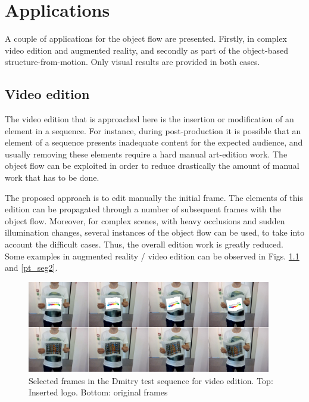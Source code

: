 \chapter{Applications} \label{chap:apps}

A couple of applications for the object flow are presented. Firstly, 
in complex video edition and augmented reality, and secondly as part 
of the object-based structure-from-motion. Only visual results are provided 
in both cases.

\section{Video edition}

The video edition that is approached here is the insertion or modification of 
an element in a sequence. For instance, during post-production it is possible that 
an element of a sequence presents inadequate content for the expected audience, and usually 
removing these elements require a hard manual art-edition work. The object flow 
can be exploited in order to reduce drastically the amount of manual work that has to be done. 

The proposed approach is to edit manually the initial frame. The elements of this edition 
can be propagated  through a number of subsequent frames with the object flow. Moreover, 
for complex scenes, with heavy occlusions and sudden illumination changes, several instances 
of the object flow can be used, to take into account the difficult cases. Thus, the overall edition 
work is greatly reduced. Some examples in augmented reality / video edition can be observed in 
Figs. \ref{pt_seg} and \ref{pt_seg2}.

   \begin{figure}[tpbh]
      \centering
      \includegraphics[width=0.95\textwidth]{../images/videoedition.png}
      \caption{  Selected frames in the Dmitry test sequence for video edition. Top: Inserted logo. Bottom: original frames}
      \label{pt_seg}
   \end{figure}

